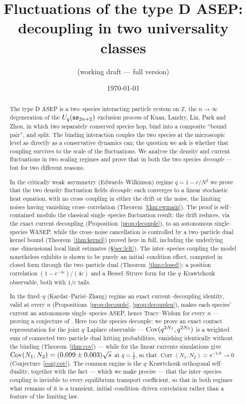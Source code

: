 \documentclass[11pt]{article}
\title{\bf Fluctuations of the type D ASEP:\\
decoupling in two universality classes}
\author{(working draft --- full version)}
\date{\today}
\theoremstyle{plain}
\theoremstyle{definition}
\theoremstyle{remark}
\DeclareMathOperator{\Corr}{Corr}\DeclareMathOperator{\cum}{cum}
\newcommand{\Z}{\mathbb{Z}}\newcommand{\R}{\mathbb{R}}\newcommand{\N}{\mathbb{N}}
\begin{document}
\maketitle

\begin{abstract}
The type D ASEP is a two--species interacting particle system on $\Z$, the
$n\to\infty$ degeneration of the $U_q(\mathfrak{so}_{2n+2})$ exclusion process of Kuan, Landry,
Lin, Park and Zhou, in which two separately conserved species hop, bind into a
composite ``bound pair'', and split. The binding interaction couples the two species
at the microscopic level as directly as a conservative dynamics can; the question we
ask is whether that coupling survives to the scale of the fluctuations. We analyse the
density and current fluctuations in two scaling regimes and prove that in both the two
species \emph{decouple} --- but for two different reasons.

In the critically weak--asymmetry (Edwards--Wilkinson) regime $q=1-c/N^2$ we prove
that the two density fluctuation fields \emph{decouple}: each converges to a linear
stochastic heat equation, with no cross--coupling in either the drift or the noise,
the limiting noises having vanishing cross--correlation (Theorem~\ref{thm:ewmain}).
The proof is self--contained modulo the classical single--species fluctuation result:
the drift reduces, via the exact current decoupling (Proposition~\ref{prop:decouple}),
to an autonomous single--species WASEP, while the cross--noise cancellation is controlled
by a two--particle dual kernel bound
(Theorem~\ref{thm:kernel}) proved here in full, including the underlying
one--dimensional local limit estimates (\S\ref{sec:lclt}). The inter--species coupling the model nonetheless exhibits is
shown to be purely an initial--condition effect, computed in closed form through the
two--particle dual (Theorem~\ref{thm:closed}): a position correlation
$(1-e^{-4c})/(4c)$ and a Bessel--Struve form for the $q$--Krawtchouk observable, both
with $1/c$ tails.

In the fixed--$q$ (Kardar--Parisi--Zhang) regime an exact current--decoupling identity,
valid at every $n$ (Propositions~\ref{prop:decouple}, \ref{prop:decouplen}), makes each
species' current an autonomous single--species ASEP, hence Tracy--Widom for every $n$
--- proving a conjecture of \cite{REU}. Here too the species decouple: we prove an
exact contact representation for the joint $q$--Laplace observable ---
$\operatorname{Cov}(q^{2N_1},q^{2N_2})$ is a weighted sum of connected two--particle dual hitting
probabilities, vanishing identically without the binding (Theorem~\ref{thm:cov}) ---
while for the linear currents simulations give
$\operatorname{Cov}(N_1,N_2)=(0.099\pm0.003)\sqrt s$ at $q=\tfrac12$, so that
$\Corr(N_1,N_2)\asymp s^{-1/6}\to0$ (Conjecture~\ref{conj:cov}). The common engine is the $q$--Krawtchouk orthogonal
self--duality, together with the fact --- which we make precise --- that the
inter--species coupling is invisible to every equilibrium transport coefficient, so
that in both regimes what remains of it is a transient, initial--condition--driven
correlation rather than a feature of the limiting law.
\end{abstract}
\end{document}
